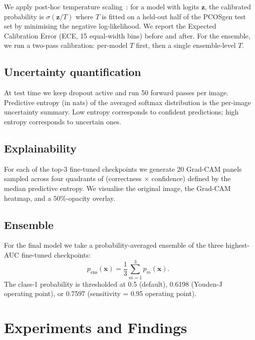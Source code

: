 \documentclass[11pt,twocolumn]{article}
\newcommand{\PCOS}{PCOS}
\newcommand{\ECE}{ECE}
\newcommand{\AUC}{AUC}
\newcommand{\GradCAM}{Grad-CAM}
\begin{document}
We apply post-hoc temperature scaling~\cite{guo2017}: for a model with
logits $\mathbf{z}$, the calibrated probability is $\sigma(\mathbf{z}/T)$
where $T$ is fitted on a held-out half of the \PCOS{}gen test set by
minimising the negative log-likelihood. We report the Expected
Calibration Error (\ECE{}, 15 equal-width bins) before and after. For
the ensemble, we run a two-pass calibration: per-model $T$ first, then a
single ensemble-level $T$.

\subsection{Uncertainty quantification}

At test time we keep dropout active and run 50 forward passes per image.
Predictive entropy (in nats) of the averaged softmax distribution is the
per-image uncertainty summary. Low entropy corresponds to confident
predictions; high entropy corresponds to uncertain ones.

\subsection{Explainability}

For each of the top-3 fine-tuned checkpoints we generate 20 \GradCAM{}
panels~\cite{selvaraju2017} sampled across four quadrants of
(correctness $\times$ confidence) defined by the median predictive
entropy. We visualise the original image, the \GradCAM{} heatmap, and a
50\%-opacity overlay.

\subsection{Ensemble}

For the final model we take a probability-averaged ensemble of the three
highest-\AUC{} fine-tuned checkpoints:
\begin{equation*}
  p_{\text{ens}}(\mathbf{x}) = \frac{1}{3} \sum_{m=1}^{3} p_m(\mathbf{x}).
\end{equation*}
The class-1 probability is thresholded at 0.5 (default), 0.6198
(Youden-J operating point), or 0.7597 (sensitivity = 0.95 operating
point).

\section{Experiments and Findings}
\end{document}
